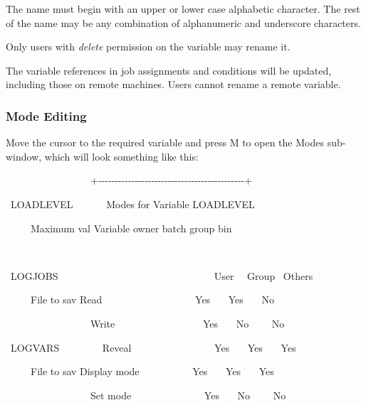 The name must begin with an upper or lower case alphabetic character. The rest of the name may be any combination of alphanumeric and
underscore characters.

Only users with \textit{delete} permission on the variable may rename it.

The variable references in job assignments and conditions will be updated, including those on remote machines. Users cannot rename a
remote variable.

\subsubsection{Mode Editing}
Move the cursor to the required variable and press M to open the Modes sub-window, which will look something like this:

\begin{exparasmall}

\ \ \ \ \ \ \ \ \ \ \ \ \ \ \ \ \ +-{}-{}-{}-{}-{}-{}-{}-{}-{}-{}-{}-{}-{}-{}-{}-{}-{}-{}-{}-{}-{}-{}-{}-{}-{}-{}-{}-{}-{}-{}-{}-{}-{}-{}-{}-{}-{}-{}-{}-{}-{}-{}-{}-+

\ LOADLEVEL \ \ \ \ \ \ {\textbar}Modes for Variable
{\textasciigrave}LOADLEVEL{\textquotesingle}
\ \ \ \ \ \ \ \ \ \ \ \ \ {\textbar}

\ \ \ \ \ Maximum val {\textbar}Variable owner batch group bin
\ \ \ \ \ \ \ \ \ \ \ \ \ {\textbar}

\ \ \ \ \ \ \ \ \ \ \ \ \ \ \ \ \ {\textbar}
\ \ \ \ \ \ \ \ \ \ \ \ \ \ \ \ \ \ \ \ \ \ \ \ \ \ \ \ \ \ \ \ \ \ \ \ \ \ \ \ \ \ \ {\textbar}

\ LOGJOBS \ \ \ \ \ \ \ \ {\textbar}
\ \ \ \ \ \ \ \ \ \ \ \ \ \ \ \ \ \ \ \ \ \ User \ \ Group \ Others
{\textbar}

\ \ \ \ \ File to sav {\textbar}Read
\ \ \ \ \ \ \ \ \ \ \ \ \ \ \ \ \ \ Yes \ \ \ Yes \ \ \ No
\ \ \ \ {\textbar}

\ \ \ \ \ \ \ \ \ \ \ \ \ \ \ \ \ {\textbar}Write
\ \ \ \ \ \ \ \ \ \ \ \ \ \ \ \ \ Yes \ \ \ No \ \ \ \ No
\ \ \ \ {\textbar}

\ LOGVARS \ \ \ \ \ \ \ \ {\textbar}Reveal
\ \ \ \ \ \ \ \ \ \ \ \ \ \ \ \ Yes \ \ \ Yes \ \ \ Yes
\ \ \ {\textbar}

\ \ \ \ \ File to sav {\textbar}Display mode \ \ \ \ \ \ \ \ \ \ Yes
\ \ \ Yes \ \ \ Yes \ \ \ {\textbar}

\ \ \ \ \ \ \ \ \ \ \ \ \ \ \ \ \ {\textbar}Set mode
\ \ \ \ \ \ \ \ \ \ \ \ \ \ Yes \ \ \ No \ \ \ \ No \ \ \ \ {\textbar}


\end{exparasmall}
